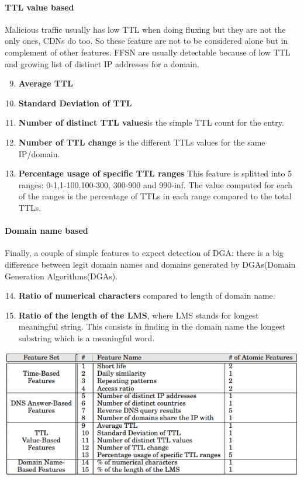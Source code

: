 \paragraph{TTL value based}
Malicious traffic usually has low TTL when doing fluxing but they are not the only ones, CDNs do too. So these feature are not to be considered alone but in complement of other features. FFSN are usually detectable because of low TTL and growing list of distinct IP addresses for a domain.
\begin{enumerate}[noitemsep]
\setcounter{enumi}{8}
\item \textbf{Average TTL}\\
\item \textbf{Standard Deviation of TTL}\\
\item \textbf{Number of distinct TTL values}is the simple TTL count for the entry.\\
\item \textbf{Number of TTL change} is the different TTLs values for the same IP/domain.\\
\item \textbf{Percentage usage of specific TTL ranges}  This feature is splitted into 5 ranges: 0-1,1-100,100-300, 300-900 and 990-inf. The value computed for each of the ranges is the percentage of TTLs in each range compared to the total TTLs.\\
\end{enumerate}
\paragraph{Domain name based}
Finally, a couple of simple features to expect detection of DGA: there is a big difference between legit domain names and domains generated by DGAs(Domain Generation Algorithms(DGAs).
\begin{enumerate}[noitemsep]
\setcounter{enumi}{13}
\item \textbf{Ratio of numerical characters} compared to length of domain name.\\
\item \textbf{Ratio of the length of the LMS}, where LMS stands for longest meaningful string. This consists in finding in the domain name the longest substring which is a meaningful word.\\
\end{enumerate}

\includegraphics[scale=.7]{img/exposure_all_features.png}


